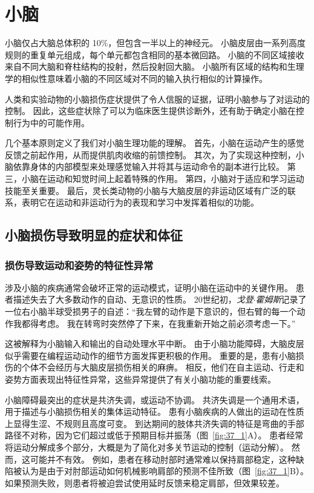 \chapter{小脑} \label{chap:chap37}

小脑仅占大脑总体积的 10\%，但包含一半以上的神经元。
小脑皮层由一系列高度规则的重复单元组成，每个单元都包含相同的基本微回路。
小脑的不同区域接收来自不同大脑和脊柱结构的投射，然后投射回大脑。
小脑所有区域的结构和生理学的相似性意味着小脑的不同区域对不同的输入执行相似的计算操作。


人类和实验动物的小脑损伤症状提供了令人信服的证据，证明小脑参与了对运动的控制。
因此，这些症状除了可以为临床医生提供诊断外，还有助于确定小脑在控制行为中的可能作用。


几个基本原则定义了我们对小脑生理功能的理解。
首先，小脑在运动产生的感觉反馈之前起作用，从而提供肌肉收缩的前馈控制。
其次，为了实现这种控制，小脑依靠身体的内部模型来处理感觉输入并将其与运动命令的副本进行比较。
第三，小脑在运动和知觉时间上起着特殊的作用。
第四，小脑对于适应和学习运动技能至关重要。
最后，灵长类动物的小脑与大脑皮层的非运动区域有广泛的联系，表明它在运动和非运动行为的表现和学习中发挥着相似的功能。



\section{小脑损伤导致明显的症状和体征}

\subsection{损伤导致运动和姿势的特征性异常}

涉及小脑的疾病通常会破坏正常的运动模式，证明小脑在运动中的关键作用。
患者描述失去了大多数动作的自动、无意识的性质。
20世纪初，\textit{戈登$\cdot$霍姆斯}记录了一位右小脑半球受损男子的自述：“我左臂的动作是下意识的，但右臂的每一个动作我都得考虑。
我在转弯时突然停了下来，在我重新开始之前必须考虑一下。”


这被解释为小脑输入和输出的自动处理水平中断。
由于小脑功能障碍，大脑皮层似乎需要在编程运动动作的细节方面发挥更积极的作用。
重要的是，患有小脑损伤的个体不会经历与大脑皮层损伤相关的麻痹。
相反，他们在自主运动、行走和姿势方面表现出特征性异常，这些异常提供了有关小脑功能的重要线索。


小脑障碍最突出的症状是共济失调，或运动不协调。
共济失调是一个通用术语，用于描述与小脑损伤相关的集体运动特征。
患有小脑疾病的人做出的运动在性质上显得生涩、不规则且高度可变。 
到达期间的肢体共济失调的特征是弯曲的手部路径不对称，因为它们超过或低于预期目标并振荡（图~\ref{fig:37_1}A）。
患者经常将运动分解成多个部分，大概是为了简化对多关节运动的控制（运动分解）。
然而，这可能并不有效。
例如，患者在移动肘部时通常难以保持肩部稳定，这种缺陷被认为是由于对肘部运动如何机械影响肩部的预测不佳所致（图~\ref{fig:37_1}B）。
如果预测失败，则患者将被迫尝试使用延时反馈来稳定肩部，但效果较差。


